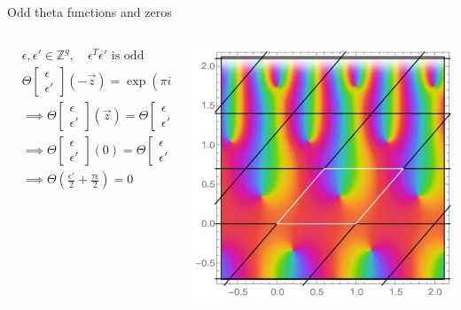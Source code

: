 \documentclass[11pt,aspectratio=169]{beamer}
\begin{document}
\begin{frame}{Odd theta functions and zeros}
    \begin{columns}[onlytextwidth]
        \begin{column}{0.55\textwidth}
            \begin{align*}
                & \epsilon,\epsilon' \in \mathbb Z^g , \quad \epsilon^T \epsilon'\text{ is odd} \\
                & \Theta\begin{bmatrix}\epsilon \\ \epsilon'\end{bmatrix}(-\vec z) = \exp(\pi i \epsilon^T \epsilon') \Theta\begin{bmatrix}\epsilon \\ \epsilon'\end{bmatrix}(\vec z)
                \\
                & \implies \Theta\begin{bmatrix}\epsilon \\ \epsilon'\end{bmatrix}(\vec z) = \Theta\begin{bmatrix}\epsilon \\ \epsilon'\end{bmatrix}(-\vec z)
                \\
                & \implies \Theta\begin{bmatrix}\epsilon \\ \epsilon'\end{bmatrix}(0) = \Theta\begin{bmatrix}\epsilon \\ \epsilon'\end{bmatrix}(\vec \lambda' + \tau \vec \lambda) = 0
                \\
                & \implies \Theta(\frac{\epsilon'}{2}+\frac{\tau\epsilon}{2}) = 0
            \end{align*}
        \end{column}
        \begin{column}{0.45\textwidth}
            \center{}
            \includegraphics[width=0.7\columnwidth]{assets/genus1theta.png}


\end{column}
\end{columns}
\end{frame}
\end{document}
